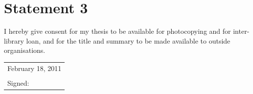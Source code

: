 \documentclass[11pt, a4paper, twoside, openright]{book}
\begin{document}
\section*{Statement 3}

I hereby give consent for my thesis to be available for
photocopying and for inter-library loan, and for the title and summary
to be made available to outside organisations.

\vspace{0.5cm}
\begin{tabular}{l}
February 18, 2011\\
\\
Signed:
\end{tabular}

\clearpage
\thispagestyle{empty}
\mbox{}

\newpage

\tableofcontents


\clearpage





































\end{document}

